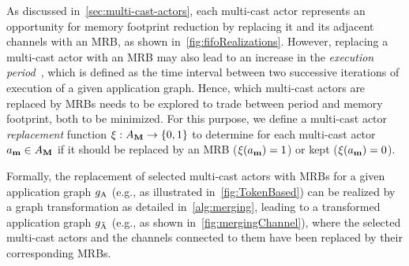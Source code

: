 As discussed in~\cref{sec:multi-cast-actors}, each multi-cast actor represents an opportunity for memory footprint reduction by replacing it and its adjacent channels with an \ac{MRB}, as shown in~\cref{fig:fifoRealizations}.
However, replacing a multi-cast actor with an \ac{MRB} may also lead to an increase in the \emph{execution period}~\cite{lft_2023-MRBs}, which is defined as the time interval between two successive iterations of execution of a given application graph.
Hence, which multi-cast actors are replaced by \acp{MRB} needs to be explored to trade between period and memory footprint, both to be minimized.
For this purpose, we define a multi-cast actor \emph{replacement} function $\useMRB: \SetActorsMulticast \rightarrow \{ 0, 1 \}$ to determine for each multi-cast actor $\actorMulticast \in \SetActorsMulticast$ if it should be replaced by an \ac{MRB} ($\useMRB(\actorMulticast) = 1$) or kept ($\useMRB(\actorMulticast) = 0$).
\par
Formally, the replacement of selected multi-cast actors with \acp{MRB} for a given application graph $g_\textrm{A}$ (e.g., as illustrated in~\cref{fig:TokenBased}) can be realized by a graph transformation as detailed in~\cref{alg:merging}, leading to a transformed application graph $g_{\tilde{\textrm{A}}}$ (e.g., as shown in~\cref{fig:mergingChannel}), where the selected multi-cast actors and the channels connected to them have been replaced by their corresponding \acp{MRB}.
\par
{}

